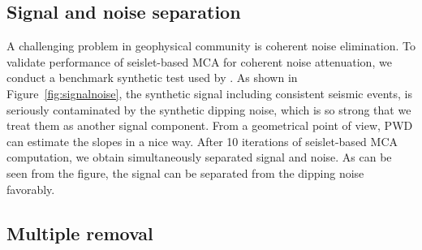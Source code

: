 \subsection{Signal and noise separation}

A challenging problem in geophysical community is coherent noise elimination. To validate performance of seislet-based MCA for coherent noise attenuation, we conduct a benchmark synthetic test used by \cite{fomel2002applications}. As shown in Figure~\ref{fig:signalnoise}, the synthetic signal including consistent seismic events, is seriously contaminated by the synthetic dipping noise, which is so strong that we treat them as another signal component. From a geometrical point of view, PWD can estimate the slopes in a nice way. After 10 iterations of  seislet-based MCA computation, we obtain simultaneously separated signal and noise. As can be seen from the figure, the signal can be separated from the dipping noise favorably.



  

\subsection{Multiple removal}

